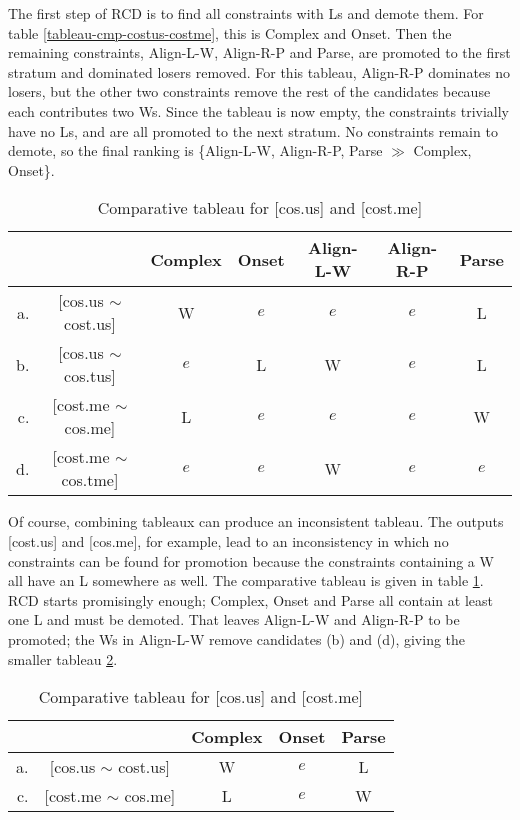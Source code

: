 \documentclass[11pt]{article}
\begin{document}
The first step of RCD is to find all constraints with Ls
and demote them. For table \ref{tableau-cmp-costus-costme}, this is
{\sc *Complex} and {\sc Onset}. Then the remaining constraints, {\sc
  Align-L-W}, {\sc Align-R-P} and {\sc Parse}, are promoted to the
first stratum and
dominated losers removed. For this tableau, {\sc Align-R-P}
dominates no losers, but the other two constraints remove the rest of
the candidates because each contributes two Ws. Since the tableau is
now empty, the constraints trivially have no Ls, and are all
promoted to the next stratum. No constraints remain to demote, so the final
ranking is \{{\sc Align-L-W, Align-R-P, Parse} $\gg$ {\sc *Complex,
  Onset}\}.

\begin{table}
\begin{tabular}{|rc||c|c|c|c|c|}\hline
 && {\sc *Complex} & {\sc Onset} & {\sc Align-L-W} & {\sc Align-R-P} & {\sc Parse} \\ \hline\hline
 a. & [cos.us $\sim$ cost.us] & W & $e$ &$e$  &$e$  & L\\ \hline
 b. & [cos.us $\sim$ cos.tus] &$e$ &L & W &$e$ &L\\ \hline
 c. & [cost.me $\sim$ cos.me] &L &$e$ &$e$ & $e$& W\\ \hline
 d. & [cost.me $\sim$ cos.tme] & $e$ &$e$ & W &$e$ &$e$\\ \hline
\end{tabular}
  \caption{Comparative tableau for [cos.us] and [cost.me]}
  \label{tableau-cmp-cosus-costme}
\end{table}

Of course, combining tableaux can produce an inconsistent tableau. The
outputs [cost.us] and [cos.me], for example, lead to an inconsistency in
which no constraints can be found for promotion because the
constraints containing a W all have an L somewhere as well. The
comparative tableau is given in table \ref{tableau-cmp-cosus-costme}.
RCD starts promisingly enough; {\sc *Complex, Onset} and {\sc Parse}
all contain at least one L and must be demoted. That leaves {\sc
  Align-L-W} and {\sc Align-R-P} to be promoted; the Ws in {Align-L-W}
remove candidates (b) and (d), giving the smaller tableau
\ref{tableau-cmp-cosus-costme-2}.

\begin{table}
\begin{tabular}{|rc||c|c|c|}\hline
 && {\sc *Complex} & {\sc Onset} & {\sc Parse} \\ \hline\hline
 a. & [cos.us $\sim$ cost.us] & W & $e$   & L\\ \hline
 c. & [cost.me $\sim$ cos.me] &L &$e$ & W\\ \hline
\end{tabular}
  \caption{Comparative tableau for [cos.us] and [cost.me]}
  \label{tableau-cmp-cosus-costme-2}
\end{table}
\end{document}
